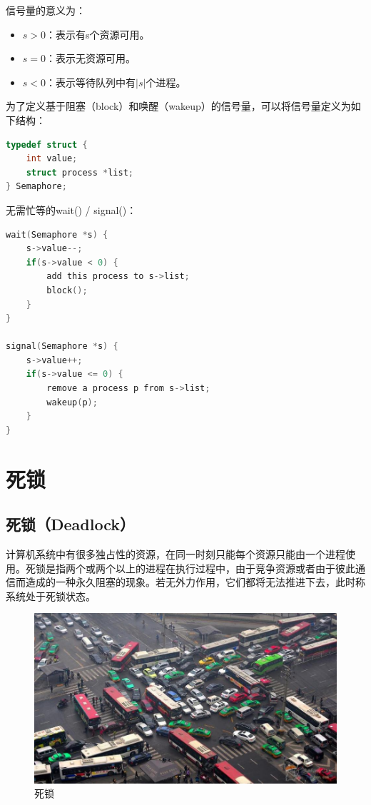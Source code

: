 信号量的意义为：

\begin{itemize}
	\item $ s > 0 $：表示有s个资源可用。
	\item $ s = 0 $：表示无资源可用。
	\item $ s < 0 $：表示等待队列中有$ |s| $个进程。
\end{itemize}

为了定义基于阻塞（block）和唤醒（wakeup）的信号量，可以将信号量定义为如下结构：

\begin{lstlisting}[language=C]
typedef struct {
	int value;
	struct process *list;
} Semaphore;
\end{lstlisting}

无需忙等的wait() / signal()：

\begin{lstlisting}[language=C]
wait(Semaphore *s) {
	s->value--;
	if(s->value < 0) {
		add this process to s->list;
		block();
	}
}

signal(Semaphore *s) {
	s->value++;
	if(s->value <= 0) {
		remove a process p from s->list;
		wakeup(p);
	}
}
\end{lstlisting}

\newpage

\section{死锁}

\subsection{死锁（Deadlock）}

计算机系统中有很多独占性的资源，在同一时刻只能每个资源只能由一个进程使用。死锁是指两个或两个以上的进程在执行过程中，由于竞争资源或者由于彼此通信而造成的一种永久阻塞的现象。若无外力作用，它们都将无法推进下去，此时称系统处于死锁状态。

\begin{figure}[H]
	\centering
	\includegraphics[]{img/C2/2-8/1.png}
	\caption{死锁}
\end{figure}

